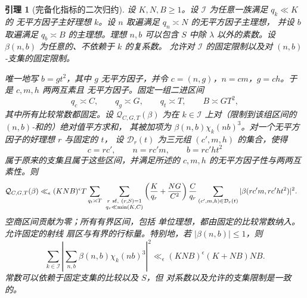 \documentclass[11pt,a4paper]{article}
\numberwithin{equation}{section}
\numberwithin{figure}{section}
\newtheorem{lemma}[theorem]{引理}
\theoremstyle{definition}
\theoremstyle{remark}
\begin{document}
\begin{lemma}[完备化指标的二次归约]
\label{lem:completed-quadratic-reduction}
设 $K,N,B\ge1$。设 $\mathcal I$ 为任意一族满足 $q_k\ll K$ 的
无平方因子主好理想 $k$。设 $n$ 取遍满足 $q_n\asymp N$ 的无平方因子主理想，
并设 $b$ 取遍满足
$q_b\asymp B$ 的主理想。理想 $n,b$ 可以包含 $S$ 中除
$\lambda$ 以外的素数。设 $\beta(n,b)$ 为任意的、不依赖于 $k$ 的复系数。
允许对 $\mathcal I$ 的固定限制以及对
$(n,b)$-支集的固定限制。

唯一地写 $b=gt^2$，其中 $g$ 无平方因子，并令
$c=(n,g)$，$n=cm$，$g=ch$。于是 $c,m,h$ 两两互素且
无平方因子。固定一组二进区间
\[
 q_c\asymp C,\qquad q_g\asymp G,\qquad q_t\asymp T,
 \qquad B\asymp GT^2,
\]
其中所有比较常数都固定。设 $\mathcal Q_{C,G,T}(\beta)$
为在 $k\in\mathcal I$ 上对（限制到该组区间的 $(n,b)$-和的）绝对值平方求和，
其被加项为
$\beta(n,b)\chi_k(nb)^3$。对一个无平方因子的好理想 $r$ 与固定的 $t$，
设 $\mathcal D_r(t)$ 为三元组 $(c',m,h)$ 的集合，使得
\[
 c=rc',\qquad n=rc'm,\qquad b=rc'ht^2
\]
属于原来的支集且属于这些区间，并满足所述的
$c,m,h$ 的无平方因子性与两两互素性。则
\begin{equation}\label{eq:completed-quadratic-reduction}
 \begin{split}
 \mathcal Q_{C,G,T}(\beta)
 \ll_\epsilon{}&(KNB)^\epsilon T
 \sum_{q_t\asymp T}\ 
 \sum_{\substack{r\ {\rm sf},\ (r,S)=1\\q_r\ll\min(K,C)}}
 \left(\frac K{q_r}+\frac{NG}{C^2}\right)\frac C{q_r}
 \sum_{(c',m,h)\in\mathcal D_r(t)}
       |\beta(rc'm,rc'ht^2)|^2.
 \end{split}
\end{equation}
空商区间贡献为零；所有有界区间，包括
单位理想，都由固定的比较常数纳入。允许固定的射线
扇区与有界的行标量。特别地，若
$|\beta(n,b)|\le1$，则
\begin{equation}\label{eq:completed-quadratic-norm}
 \sum_{k\in\mathcal I}
 \left|\sum_{n,b}\beta(n,b)\chi_k(nb)^3\right|^2
 \ll_\epsilon (KNB)^\epsilon(K+NB)NB.
\end{equation}
常数可以依赖于固定支集的比较以及 $S$，但
对系数以及允许的支集限制是一致的。
\end{lemma}
\end{document}
